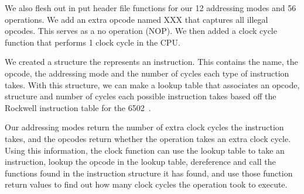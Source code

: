 \documentclass[12pt]{article}
\newcommand{\singlespace}{
  \protect\renewcommand\baselinestretch{1.0}
  \protect\normalsize
}
\begin{document}
We also flesh out in put header file functions for our 12 addressing modes and 56 operations. We add
an extra opcode named XXX that captures all illegal opcodes. This serves as a no operation (NOP). We then
added a clock cycle function that performs 1 clock cycle in the CPU.

We created a structure the represents an instruction. This contains the name, the opcode, the addressing mode
and the number of cycles each type of instruction takes. With this structure, we can make a lookup table that
associates an opcode, structure and number of cycles each possible instruction takes based off the Rockwell instruction table
for the 6502~\cite{6502}.

Our addressing modes return the number of extra clock cycles the instruction takes, and the opcodes return
whether the operation takes an extra clock cycle. Using this information, the clock function can use the
lookup table to take an instruction, lookup the opcode in the lookup table, dereference and call the functions
found in the instruction structure it has found, and use those function return values to find out how many clock
cycles the operation took to execute.

\singlespace




\end{document}
